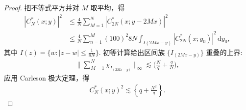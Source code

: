 \begin{proof}
把不等式平方并对 $M$ 取平均，得
\begin{align*}
  |C_{N}^{*}(x;y)|^{2}
  &\leq\frac{4}{N}\sum_{M=1}^{N}|C_{2N}^{*}(x;y-2Mx)|^{2}\\
  &\leq\frac{4}{N}\sum_{n=1}^{M}(100)^{2}8N\int_{I(2Mx-y)}|C_{2N}^{*}(x;y_{0})|^{2}\,\mathrm{d}y_{0},
\end{align*}
其中 $I(z) = \{w : |z - w| \leq \frac{1}{8N}\}$. 初等计算给出区间族 $\{I_{(2M x - y)}\}$ 重叠的上界:
\begin{align*}
  \Big\|\sum_{M=1}^{N}\chi_{I_{(2M x-y)}}\Big\|_{\infty}\lesssim\Big(\frac{N}{q}+\frac{q}{N}\Big),
\end{align*}
应用 Carleson 极大定理，得
\begin{align*}
  C_{N}^{*}(x;y)^{2}\lesssim\left\{q+\frac{N^{2}}{q}\right\}.
\end{align*}
\end{proof}


